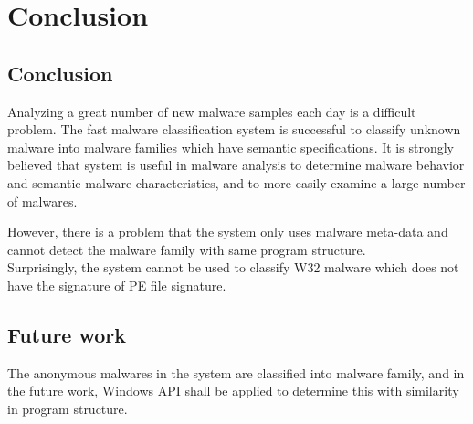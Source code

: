 
\chapter{Conclusion}\label{chap:7}
\section{Conclusion}
Analyzing a great number of new malware samples each day is a difficult problem. The fast malware classification system is successful to classify unknown malware into malware families which have semantic specifications. It is strongly believed that system is useful in malware analysis to determine malware behavior and semantic malware characteristics, and to more easily examine a large number of malwares.

However, there is a problem that the system only uses malware meta-data and cannot detect the malware family with same program structure.\\
Surprisingly, the system cannot be used to classify W32 malware which does not have the signature of PE file signature. 
 
\section{Future work}
The anonymous malwares in the system are classified into malware family, and in the future work, Windows API shall be applied to determine this with similarity in program structure. 